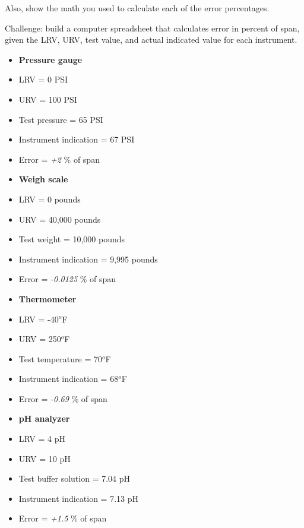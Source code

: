 \vskip 10pt

Also, show the math you used to calculate each of the error percentages.

\vskip 10pt

Challenge: build a computer spreadsheet that calculates error in percent of span, given the LRV, URV, test value, and actual indicated value for each instrument.







\begin{itemize}
\item{} {\bf Pressure gauge}
\item{} LRV = 0 PSI
\item{} URV = 100 PSI 
\item{} Test pressure = 65 PSI 
\item{} Instrument indication = 67 PSI
\item{} Error = {\it +2} \% of span
\end{itemize}

\vskip 10pt

\begin{itemize}
\item{} {\bf Weigh scale}
\item{} LRV = 0 pounds
\item{} URV = 40,000 pounds
\item{} Test weight = 10,000 pounds
\item{} Instrument indication = 9,995 pounds
\item{} Error = {\it -0.0125} \% of span
\end{itemize}

\vskip 10pt

\begin{itemize}
\item{} {\bf Thermometer}
\item{} LRV = -40$^{o}$F
\item{} URV = 250$^{o}$F
\item{} Test temperature = 70$^{o}$F
\item{} Instrument indication = 68$^{o}$F
\item{} Error = {\it -0.69} \% of span
\end{itemize}

\vskip 10pt

\begin{itemize}
\item{} {\bf pH analyzer}
\item{} LRV = 4 pH
\item{} URV = 10 pH
\item{} Test buffer solution = 7.04 pH
\item{} Instrument indication = 7.13 pH
\item{} Error = {\it +1.5} \% of span
\end{itemize}

